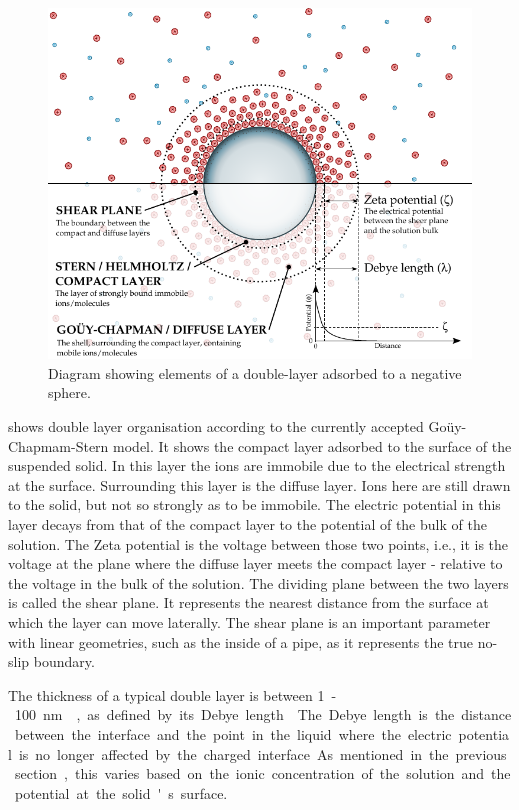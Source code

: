     \begin{figure}
      \begin{center}
        \includegraphics{content/introduction/graphics/doubleLayer_version2}
      \end{center}
      \caption{Diagram showing elements of a double-layer adsorbed to a negative sphere.}
      \label{fig:doubleLayer_anatomy}
    \end{figure}
     shows double layer organisation according to the currently accepted Goüy-Chapmam-Stern model.
    It shows the compact layer adsorbed to the surface of the suspended solid.
    In this layer the ions are immobile due to the electrical strength at the surface.
    Surrounding this layer is the diffuse layer.
    Ions here are still drawn to the solid, but not so strongly as to be immobile.
    The electric potential in this layer decays from that of the compact layer to the potential of the bulk of the solution.
    The Zeta potential is the voltage between those two points, i.e., it is the voltage at the plane where the diffuse layer meets the compact layer - relative to the voltage in the bulk of the solution.
    The dividing plane between the two layers is called the shear plane.
    It represents the nearest distance from the surface at which the layer can move laterally.
    The shear plane is an important parameter with linear geometries, such as the inside of a pipe, as it represents the true no-slip boundary.

    The thickness of a typical double layer is between \SI{1}-\SI{100}{\nano\meter}~\cite{Jiang2010}, as defined by its Debye length~\cite{Israelachvili2011}.
    The Debye length is the distance between the interface and the point in the liquid where the electric potential is no longer affected by the charged interface.
    As mentioned in the previous section, this varies based on the ionic concentration of the solution and the potential at the solid's surface.


